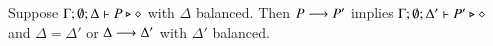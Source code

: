 
\begin{theorem}\label{t:sr}%
%
			Suppose $\Gamma; \emptyset; \Delta \vdash P \triangleright \diamond$
			with
			$\Delta$ balanced. 
			Then $P \longrightarrow P'$ implies $\Gamma; \emptyset; \Delta'  \vdash P' \triangleright \diamond$
			and $\Delta = \Delta'$ or $\Delta \longrightarrow \Delta'$
			with $\Delta'$ balanced. 
\end{theorem}
